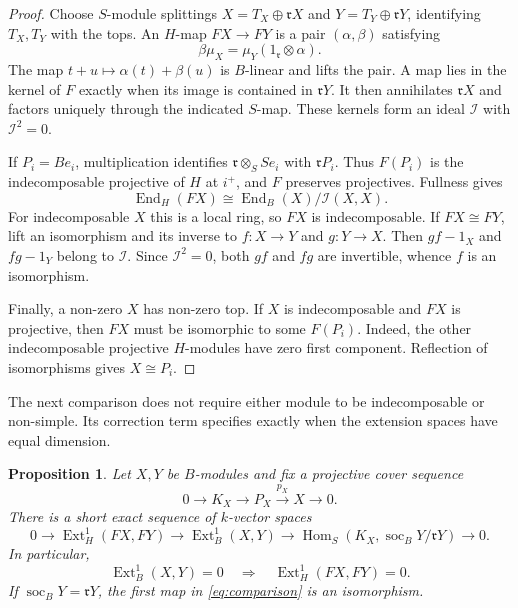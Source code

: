 \documentclass[a4paper,reqno]{amsart}
\numberwithin{equation}{section}
\newtheorem{proposition}[proposition]{Proposition}
\newcommand{\Ext}{\operatorname{Ext}}
\newcommand{\Hom}{\operatorname{Hom}}
\newcommand{\End}{\operatorname{End}}
\newcommand{\soc}{\operatorname{soc}}
\begin{document}
\begin{proof}
Choose $S$-module splittings $X=T_X\oplus\mathfrak rX$ and
$Y=T_Y\oplus\mathfrak rY$, identifying $T_X,T_Y$ with the tops.
An $H$-map $FX\to FY$ is a pair $(\alpha,\beta)$ satisfying
\[
 \beta\mu_X=\mu_Y(1_{\mathfrak r}\otimes\alpha).
\]
The map $t+u\mapsto\alpha(t)+\beta(u)$ is $B$-linear and lifts the
pair. A map lies in the kernel of $F$ exactly when its image is
contained in $\mathfrak rY$. It then annihilates $\mathfrak rX$ and
factors uniquely through the indicated $S$-map. These kernels form
an ideal $\mathcal I$ with $\mathcal I^2=0$.

If $P_i=Be_i$, multiplication identifies
$\mathfrak r\otimes_S Se_i$ with $\mathfrak rP_i$. Thus $F(P_i)$ is
the indecomposable projective of $H$ at $i^+$, and $F$ preserves
projectives. Fullness gives
\[
 \End_H(FX)\cong\End_B(X)/\mathcal I(X,X).
\]
For indecomposable $X$ this is a local ring, so $FX$ is
indecomposable. If $FX\cong FY$, lift an isomorphism and its inverse
to $f:X\to Y$ and $g:Y\to X$. Then $gf-1_X$ and $fg-1_Y$ belong
to $\mathcal I$. Since $\mathcal I^2=0$, both $gf$ and $fg$ are
invertible, whence $f$ is an isomorphism.

Finally, a non-zero $X$ has non-zero top. If $X$ is indecomposable
and $FX$ is projective, then $FX$ must be isomorphic to some
$F(P_i)$. Indeed, the other indecomposable projective $H$-modules have
zero first component. Reflection of isomorphisms gives $X\cong P_i$.
\end{proof}

The next comparison does not require either module to be
indecomposable or non-simple. Its correction term specifies exactly
when the extension spaces have equal dimension.

\begin{proposition}\label{prop:comparison}
Let $X,Y$ be $B$-modules and fix a projective cover sequence
\[
 0\longrightarrow K_X\longrightarrow P_X\xrightarrow{p_X}X
 \longrightarrow0.
\]
There is a short exact sequence of $k$-vector spaces
\begin{equation}\label{eq:comparison}
 0\longrightarrow\Ext_H^1(FX,FY)
 \longrightarrow\Ext_B^1(X,Y)
 \longrightarrow\Hom_S(K_X,\soc_B Y/\mathfrak rY)
 \longrightarrow0.
\end{equation}
In particular,
\begin{equation}\label{eq:ext-implication}
 \Ext_B^1(X,Y)=0\quad\Longrightarrow\quad\Ext_H^1(FX,FY)=0.
\end{equation}
If $\soc_B Y=\mathfrak rY$, the first map in
\eqref{eq:comparison} is an isomorphism.
\end{proposition}
\end{document}
